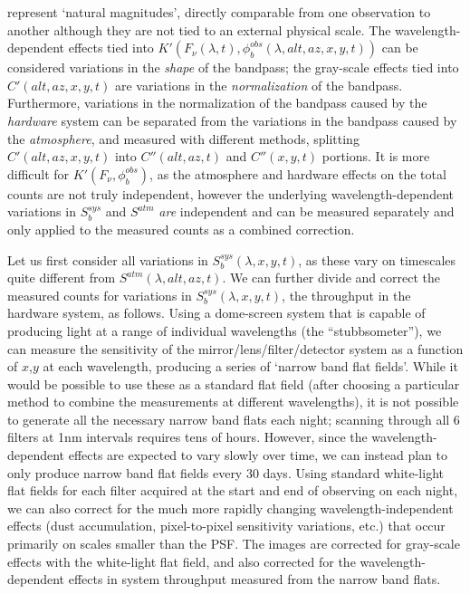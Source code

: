 \documentclass[12pt,preprint]{aastex}
\begin{document}
represent `natural magnitudes', directly comparable from
one observation to another although they are not tied to an external
physical scale. The wavelength-dependent effects tied into
$K'(F_\nu(\lambda,t), \phi_b^{obs}(\lambda,alt,az,x,y,t))$ can be
considered variations in the {\it shape} of the bandpass; the
gray-scale effects tied into $C'(alt,az,x,y,t)$ are variations in the
{\it normalization} of the bandpass.  Furthermore, variations in the
normalization of the bandpass caused by the {\it hardware} system can be separated from the
variations in the bandpass caused by the {\it atmosphere}, and
measured with different methods, splitting
$C'(alt,az,x,y,t)$ into $C''(alt,az,t)$ and $C''(x,y,t)$ portions. It
is more difficult for $K'(F_\nu, \phi_b^{obs})$, as the atmosphere and
hardware effects on the total counts are not truly independent,
however the underlying wavelength-dependent variations in $S_b^{sys}$
and $S^{atm}$ {\it are} independent and can be measured separately and
only applied to the measured counts as a combined correction. 

Let us first consider all variations in $S_b^{sys}(\lambda,x,y,t)$, as
these vary on timescales quite different from
$S^{atm}(\lambda,alt,az,t)$.  We can further divide and correct the
measured counts for variations in $S_b^{sys}(\lambda,x,y,t)$, the
throughput in the hardware system, as follows. Using a dome-screen
system that is capable of producing light at a range of individual
wavelengths (the ``stubbsometer''), we can measure the sensitivity of
the mirror/lens/filter/detector system as a function of $x$,$y$ at
each wavelength, producing a series of `narrow band flat
fields'. While it would be possible to use these as a standard flat
field (after choosing a particular method to combine the measurements
at different wavelengths), it is not possible to generate all the
necessary narrow band flats each night; scanning through all 6 filters
at 1nm intervals requires tens of hours. However, since the
wavelength-dependent effects are expected to vary slowly over time, we
can instead plan to only produce narrow band flat fields every 30
days. Using standard white-light flat fields for each filter acquired
at the start and end of observing on each night, we can also correct
for the much more rapidly changing wavelength-independent effects
(dust accumulation, pixel-to-pixel sensitivity variations, etc.) that
occur primarily on scales smaller than the PSF. The images are
corrected for gray-scale effects with the white-light flat field, and
also corrected for the wavelength-dependent effects in system
throughput measured from the narrow band flats.
\end{document}
